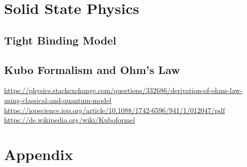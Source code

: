 \documentclass[9pt]{report}
\begin{document}
\chapter{Solid State Physics}

\section{Tight Binding Model}

\section{Kubo Formalism and Ohm's Law}

\url{https://physics.stackexchange.com/questions/332686/derivation-of-ohms-law-using-classical-and-quantum-model}\\
\url{https://iopscience.iop.org/article/10.1088/1742-6596/941/1/012047/pdf}\\
\url{https://de.wikipedia.org/wiki/Kuboformel}\\
























\chapter{Appendix}
\end{document}
